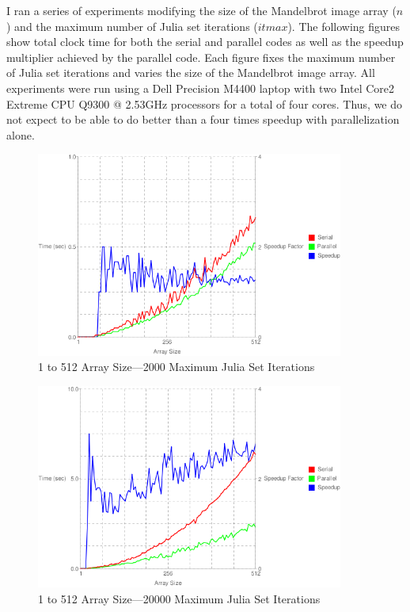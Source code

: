 \documentclass{article}
\begin{document}
I ran a series of experiments modifying the size of the Mandelbrot image array (\(n\)) and the maximum number of Julia set iterations (\(itmax\)). The following figures show total clock time for both the serial and parallel codes as well as the speedup multiplier achieved by the parallel code. Each figure fixes the maximum number of Julia set iterations and varies the size of the Mandelbrot image array. All experiments were run using a Dell Precision M4400 laptop with two Intel Core2 Extreme CPU Q9300 @ 2.53GHz processors for a total of four cores. Thus, we do not expect to be able to do better than a four times speedup with parallelization alone.

\begin{figure}
\centering
\includegraphics[width=0.9\textwidth]{chart1nt.png}
\caption{1 to 512 Array Size---2000 Maximum Julia Set Iterations}
\label{chart1}
\end{figure}

\begin{figure}
\centering
\includegraphics[width=0.9\textwidth]{chart2nt.png}
\caption{1 to 512 Array Size---20000 Maximum Julia Set Iterations}
\label{chart2}
\end{figure}
\end{document}
